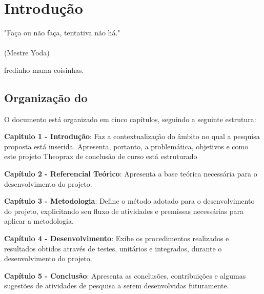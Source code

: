 \chapter{Introdução}
\label{chap:intro}
\begin{flushright}
	"Faça ou não faça, tentativa não há." \\
	\ \\
	(Mestre Yoda)
\end{flushright}

fredinho mama coisinhas.



\section{Organização do \thetypework}
\label{section:organizacao}
O documento está organizado em cinco capítulos, seguindo a seguinte estrutura:

\textbf{Capitulo 1 - Introdução}: Faz a contextualização do âmbito no qual a pesquisa proposta
está inserida. Apresenta, portanto, a problemática, objetivos e como este projeto Theoprax de conclusão de curso está estruturado


\textbf{Capítulo 2 - Referencial Teórico}: Apresenta a base teórica necessária para o desenvolvimento do projeto.

\textbf{Capítulo 3 - Metodologia}: Define o método adotado para o desenvolvimento do projeto, explicitando seu fluxo de atividades e premissas necessárias para aplicar a metodologia.

\textbf{Capítulo 4 - Desenvolvimento}: Exibe os procedimentos realizados e resultados obtidos através de testes, unitários e integrados, durante o desenvolvimento do projeto.

\textbf{Capítulo 5 - Conclusão}: Apresenta as conclusões, contribuições e algumas sugestões de atividades de pesquisa a serem desenvolvidas futuramente.


